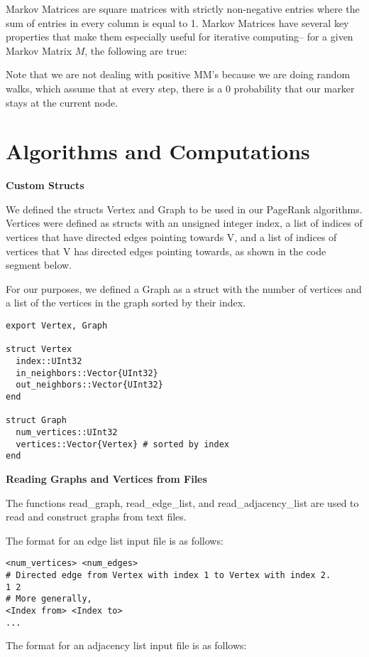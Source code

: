 \documentclass[12pt, titlepage, twoside]{amsart}
\theoremstyle{remark}
\begin{document}
Markov Matrices are square matrices with strictly non-negative entries where the sum of entries in every column is equal to 1. Markov Matrices have several key properties that make them especially useful for iterative computing-- for a given Markov Matrix $M$, the following are true:


Note that we are not dealing with positive MM's because we are doing random walks, which assume that at every step, there is a 0 probability that our marker stays at the current node.


\section{Algorithms and Computations}

\textbf{Custom Structs}

We defined the structs Vertex and Graph to be used in our PageRank algorithms. Vertices were defined as structs with an unsigned integer index, a list of indices of vertices that have directed edges pointing towards V, and a list of indices of vertices that V has directed edges pointing towards, as shown in the code segment below. 

For our purposes, we defined a Graph as a struct with the number of vertices and a list of the vertices in the graph sorted by their index.

\begin{verbatim}
export Vertex, Graph

struct Vertex
  index::UInt32
  in_neighbors::Vector{UInt32}
  out_neighbors::Vector{UInt32}
end

struct Graph
  num_vertices::UInt32
  vertices::Vector{Vertex} # sorted by index
end
\end{verbatim}

\textbf{Reading Graphs and Vertices from Files}

The functions read\_graph, read\_edge\_list, and read\_adjacency\_list are used to read and construct graphs from text files.

The format for an edge list input file is as follows:

\begin{lstlisting}[basicstyle=\small]
<num_vertices> <num_edges>
# Directed edge from Vertex with index 1 to Vertex with index 2.
1 2
# More generally,
<Index from> <Index to>
...
\end{lstlisting}

The format for an adjacency list input file is as follows:
\end{document}
